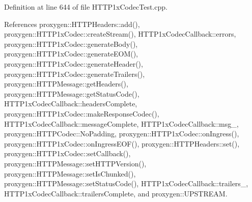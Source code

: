 Definition at line 644 of file H\+T\+T\+P1x\+Codec\+Test.\+cpp.



References proxygen\+::\+H\+T\+T\+P\+Headers\+::add(), proxygen\+::\+H\+T\+T\+P1x\+Codec\+::create\+Stream(), H\+T\+T\+P1x\+Codec\+Callback\+::errors, proxygen\+::\+H\+T\+T\+P1x\+Codec\+::generate\+Body(), proxygen\+::\+H\+T\+T\+P1x\+Codec\+::generate\+E\+O\+M(), proxygen\+::\+H\+T\+T\+P1x\+Codec\+::generate\+Header(), proxygen\+::\+H\+T\+T\+P1x\+Codec\+::generate\+Trailers(), proxygen\+::\+H\+T\+T\+P\+Message\+::get\+Headers(), proxygen\+::\+H\+T\+T\+P\+Message\+::get\+Status\+Code(), H\+T\+T\+P1x\+Codec\+Callback\+::headers\+Complete, proxygen\+::\+H\+T\+T\+P1x\+Codec\+::make\+Response\+Codec(), H\+T\+T\+P1x\+Codec\+Callback\+::message\+Complete, H\+T\+T\+P1x\+Codec\+Callback\+::msg\+\_\+, proxygen\+::\+H\+T\+T\+P\+Codec\+::\+No\+Padding, proxygen\+::\+H\+T\+T\+P1x\+Codec\+::on\+Ingress(), proxygen\+::\+H\+T\+T\+P1x\+Codec\+::on\+Ingress\+E\+O\+F(), proxygen\+::\+H\+T\+T\+P\+Headers\+::set(), proxygen\+::\+H\+T\+T\+P1x\+Codec\+::set\+Callback(), proxygen\+::\+H\+T\+T\+P\+Message\+::set\+H\+T\+T\+P\+Version(), proxygen\+::\+H\+T\+T\+P\+Message\+::set\+Is\+Chunked(), proxygen\+::\+H\+T\+T\+P\+Message\+::set\+Status\+Code(), H\+T\+T\+P1x\+Codec\+Callback\+::trailers\+\_\+, H\+T\+T\+P1x\+Codec\+Callback\+::trailers\+Complete, and proxygen\+::\+U\+P\+S\+T\+R\+E\+AM.


